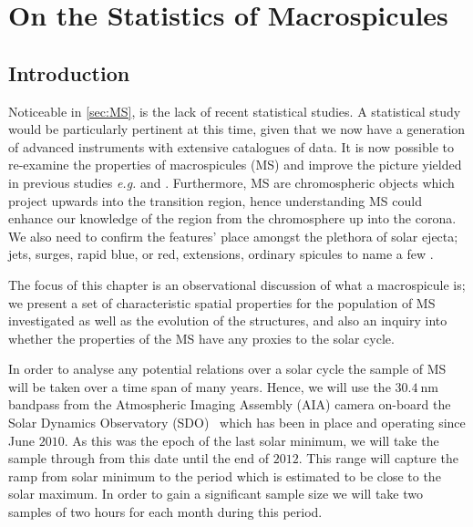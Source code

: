 
\chapter{On the Statistics of Macrospicules}
\label{ch:3} 

\section{Introduction}

Noticeable in \cref{sec:MS}, is the lack of recent statistical studies.
A statistical study would be particularly pertinent at this time, given that we now have a generation of advanced instruments with extensive catalogues of data.
It is now possible to re-examine the properties of macrospicules (MS) and improve the picture yielded in previous studies \emph{e.g.} \cite{Bohlin1975} and \cite{Dere89}. Furthermore, MS are chromospheric objects which project upwards into the transition region, hence understanding MS could enhance our knowledge of the region from the chromosphere up into the corona. We also need to confirm the features' place amongst the plethora of solar ejecta; jets, surges, rapid blue, or red, extensions, ordinary spicules to name a few \cite{Tsiropoula2012}.

The focus of this chapter is an observational discussion of what a macrospicule is; we present a set of characteristic spatial properties for the population of MS investigated as well as the evolution of the structures, and also an inquiry into whether the properties of the MS have any proxies to the solar cycle.

In order to analyse any potential relations over a solar cycle the sample of MS will be taken over a time span of many years. Hence, we will use the $30.4\ \textrm{nm}$ bandpass from the Atmospheric Imaging Assembly (AIA) camera on-board the Solar Dynamics Observatory (SDO) \cite{AIAspec}\, which has been in place and operating since June $2010$. As this was the epoch of the last solar minimum, we will take the sample through from this date until the end of $2012$. This range will capture the ramp from solar minimum to the period which is estimated to be close to the solar maximum. In order to gain a significant sample size we will take two samples of two hours for each month during this period.


